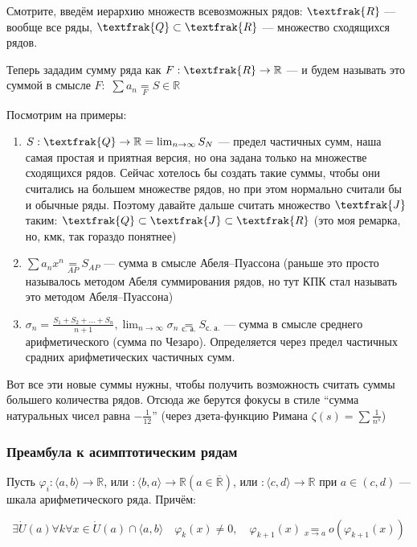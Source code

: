 \documentclass{article}
\def\dbl{\,\,}
\def\eqby#1{\underset{#1}{=}}
\begin{document}
Смотрите, введём иерархию множеств всевозможных рядов: $\textfrak{R}$ --- вообще все ряды, $\textfrak{Q} \subset \textfrak{R}$ --- множество сходящихся рядов.

Теперь зададим сумму ряда как $F: \textfrak{R} \rightarrow \mathbb{R}$ --- и будем называть это суммой в смысле $F: \dbl \sum a_n \eqby{F} S \in \mathbb{R}$

Посмотрим на примеры: 

\begin{enumerate}
    \item $S: \textfrak{Q} \rightarrow \mathbb{R} = \lim_{n \rightarrow \infty} S_N$ --- предел частичных сумм, наша самая простая и приятная версия, но она задана только на множестве сходящихся рядов. Сейчас хотелось бы создать такие суммы, чтобы они считались на большем множестве рядов, но при этом нормально считали бы и обычные ряды. Поэтому давайте дальше считать множество $\textfrak{J}$ таким: $\textfrak{Q} \subset \textfrak{J} \subset \textfrak{R}$ (это моя ремарка, но, кмк, так гораздо понятнее)
    \item $\sum a_n x^n \eqby{AP} S_{AP}$ --- сумма в смысле Абеля--Пуассона (раньше это просто называлось методом Абеля суммирования рядов, но тут КПК стал называть это методом Абеля--Пуассона)
    \item $\sigma_n = \frac{S_1 + S_2 + \ldots + S_n}{n + 1}, \lim_{n \rightarrow \infty} \sigma_n \eqby{\text{с. а.}} S_{\text{с. а.}}$ --- сумма в смысле среднего арифметического (сумма по Чезаро). Определяется через предел частичных срадних арифметических частичных сумм.
\end{enumerate}

Вот все эти новые суммы нужны, чтобы получить возможность считать суммы большего количества рядов. Отсюда же берутся фокусы в стиле ``сумма натуральных чисел равна $-\frac{1}{12}$'' (через дзета-функцию Римана $\zeta(s) = \sum \frac{1}{n^s}$)

\subsubsection{Преамбула к асимптотическим рядам}

Пусть $\varphi_i: \langle a, b \rangle \rightarrow \mathbb{R}$, или $: \langle b, a \rangle \rightarrow \mathbb{R} (a \in \overline{\mathbb{R}})$, или $: \langle c, d \rangle \rightarrow \mathbb{R}$ при $a \in (c, d)$ --- шкала арифметического ряда. Причём: 

\[\exists \dot{U}(a) \forall k \forall x \in \dot{U}(a) \cap \langle a, b \rangle \quad \varphi_{k}(x) \neq 0, \quad \varphi_{k + 1}(x) \underset{x \rightarrow a}{=} o(\varphi_{k + 1}(x))\]
\end{document}
